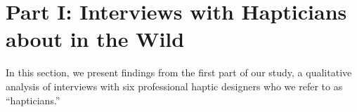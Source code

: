 \section{Part I: Interviews with Hapticians about \haxd{} in the Wild}
\label{sec:interviews}
\noindent
In this section, we present findings from the first part of our study, a qualitative analysis of interviews with six professional haptic designers who we refer to as ``hapticians.''





